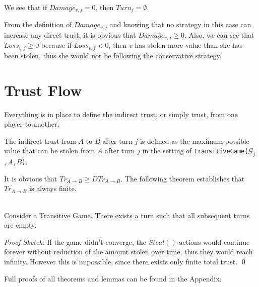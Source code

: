 \documentclass[11pt]{llncs}
\theoremstyle{definition}
\newenvironment{proofsketch}{\textit{Proof Sketch.}}{\qed \smallskip \ \\}
\begin{document}
     We see that if $Damage_{v, j} = 0$, then $Turn_j = \emptyset$.

     From the definition of $Damage_{v,j}$ and knowing that no strategy in this case can increase any direct trust, it is
     obvious that $Damage_{v,j} \geq 0$. Also, we can see that $Loss_{v,j} \geq 0$ because if $Loss_{v,j} < 0$, then $v$ has
     stolen more value than she has been stolen, thus she would not be following the conservative strategy.
  \section{Trust Flow}
    Everything is in place to define the indirect trust, or simply trust, from one player to another.
    \begin{definition}
       The indirect trust from $A$ to $B$ after turn $j$ is defined as the maximum possible value that can be stolen from
       $A$ after turn $j$ in the setting of \texttt{TransitiveGame(}$\mathcal{G}_j$\texttt{,}$A$\texttt{,}$B$\texttt{)}.
    \end{definition}
    It is obvious that $Tr_{A \rightarrow B} \geq DTr_{A \rightarrow B}$. The following theorem establishes that
    $Tr_{A \rightarrow B}$ is always finite.
    \begin{theorem} \ \\
       \label{convergence}
       Consider a Transitive Game. There exists a turn such that all subsequent turns are empty.
    \end{theorem}
    \begin{proofsketch}
       If the game didn't converge, the $Steal\left(\right)$ actions would continue forever without reduction of the amount
       stolen over time, thus they would reach infinity. However this is impossible, since there exists only finite total
       trust.
    \end{proofsketch}

    Full proofs of all theorems and lemmas can be found in the Appendix.
\end{document}
